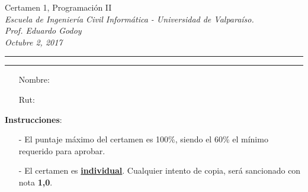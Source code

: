 \documentclass[10pt]{article}
\begin{document}
\begin{center}
    {\Large  Certamen 1, Programaci\'on II} \\
    \emph{\small Escuela de Ingenier\'ia Civil Inform\'atica - Universidad de Valpara\'iso. } \\
    \emph{\small Prof. Eduardo Godoy} \\
    \emph{\scriptsize Octubre 2, 2017}
\end{center}

\vspace*{-35pt}
\begin{center}
    \rule{1\textwidth}{.3pt}
\end{center}
\vspace*{-42pt}
\begin{center}
    \rule{1\textwidth}{2pt}
\end{center}
\begin{multicols}{2}
  \begin{itemize}
    \item[] Nombre:
  \end{itemize}
  \begin{itemize}
    \item[] Rut:
  \end{itemize}

\end{multicols}
\vspace*{-15pt}
{\small \textbf{Instrucciones}:}
\vspace*{-15pt}

{\scriptsize
\begin{itemize}
    \item[-] El puntaje m\'aximo del certamen es 100\%, siendo el 60\% el m\'inimo requerido para aprobar.
    \item[-] El certamen es \underline{\textbf{individual}}. Cualquier intento de copia, ser\'a sancionado con nota \textbf{1,0}.
\end{itemize}
}
\vspace*{-20pt}
\end{document}
